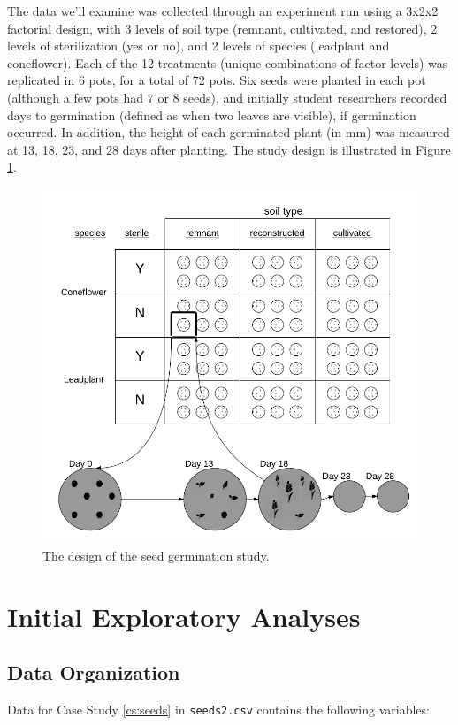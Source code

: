 \documentclass[
]{krantz}
\begin{document}
The data we'll examine was collected through an experiment run using a 3x2x2 factorial design, with 3 levels of soil type (remnant, cultivated, and restored), 2 levels of sterilization (yes or no), and 2 levels of species (leadplant and coneflower). Each of the 12 treatments (unique combinations of factor levels) was replicated in 6 pots, for a total of 72 pots. Six seeds were planted in each pot (although a few pots had 7 or 8 seeds), and initially student researchers recorded days to germination (defined as when two leaves are visible), if germination occurred. In addition, the height of each germinated plant (in mm) was measured at 13, 18, 23, and 28 days after planting. The study design is illustrated in Figure \ref{fig:seedstudy}.

\begin{figure}
\includegraphics[width=0.8\linewidth]{data/StudyDesignDiagram} \caption{The design of the seed germination study.}\label{fig:seedstudy}
\end{figure}

\hypertarget{explore3}{%
\section{Initial Exploratory Analyses}\label{explore3}}

\hypertarget{organizedata3}{%
\subsection{Data Organization}\label{organizedata3}}

Data for Case Study \ref{cs:seeds} in \texttt{seeds2.csv} contains the following variables:
\end{document}
